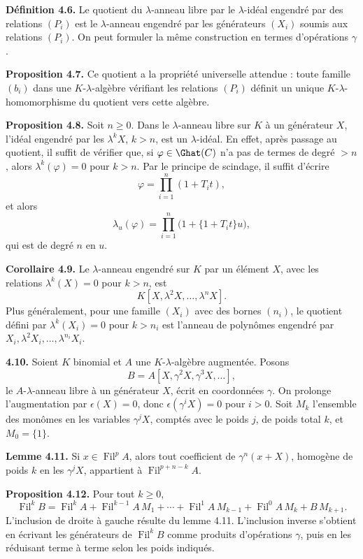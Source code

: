 \documentclass[11pt]{article}
\newcommand{\Fil}{\operatorname{Fil}}
\begin{document}
\textbf{Définition 4.6.} Le quotient du \(\lambda\)-anneau libre par le \(\lambda\)-idéal engendré par des relations \((P_i)\) est le \(\lambda\)-anneau engendré par les générateurs \((X_i)\) soumis aux relations \((P_i)\). On peut formuler la même construction en termes d'opérations \(\gamma\).

\textbf{Proposition 4.7.} Ce quotient a la propriété universelle attendue : toute famille \((b_i)\) dans une \(K\)-\(\lambda\)-algèbre vérifiant les relations \((P_i)\) définit un unique \(K\)-\(\lambda\)-homomorphisme du quotient vers cette algèbre.

\textbf{Proposition 4.8.} Soit \(n\ge0\). Dans le \(\lambda\)-anneau libre sur \(K\) à un générateur \(X\), l'idéal engendré par les \(\lambda^kX\), \(k>n\), est un \(\lambda\)-idéal. En effet, après passage au quotient, il suffit de vérifier que, si \(\varphi\in\Ghat(C)\) n'a pas de termes de degré \(>n\), alors \(\lambda^k(\varphi)=0\) pour \(k>n\). Par le principe de scindage, il suffit d'écrire
\[
  \varphi=\prod_{i=1}^{n}(1+T_it),
\]
et alors
\[
  \lambda_u(\varphi)=\prod_{i=1}^{n}\bigl(1+\{1+T_it\}u\bigr),
\]
qui est de degré \(n\) en \(u\).

\textbf{Corollaire 4.9.} Le \(\lambda\)-anneau engendré sur \(K\) par un élément \(X\), avec les relations \(\lambda^k(X)=0\) pour \(k>n\), est
\[
  K[X,\lambda^2X,\ldots,\lambda^nX].
\]
Plus généralement, pour une famille \((X_i)\) avec des bornes \((n_i)\), le quotient défini par \(\lambda^k(X_i)=0\) pour \(k>n_i\) est l'anneau de polynômes engendré par \(X_i,\lambda^2X_i,\ldots,\lambda^{n_i}X_i\).

\textbf{4.10.} Soient \(K\) binomial et \(A\) une \(K\)-\(\lambda\)-algèbre augmentée. Posons
\[
  B=A[X,\gamma^2X,\gamma^3X,\ldots],
\]
le \(A\)-\(\lambda\)-anneau libre à un générateur \(X\), écrit en coordonnées \(\gamma\). On prolonge l'augmentation par \(\epsilon(X)=0\), donc \(\epsilon(\gamma^iX)=0\) pour \(i>0\). Soit \(M_k\) l'ensemble des monômes en les variables \(\gamma^jX\), comptés avec le poids \(j\), de poids total \(k\), et \(M_0=\{1\}\).

\textbf{Lemme 4.11.} Si \(x\in\Fil^pA\), alors tout coefficient de \(\gamma^n(x+X)\), homogène de poids \(k\) en les \(\gamma^jX\), appartient à \(\Fil^{p+n-k}A\).

\textbf{Proposition 4.12.} Pour tout \(k\ge0\),
\begin{equation}\tag{4.12.1}
  \Fil^kB=
  \Fil^kA+\Fil^{k-1}A\,M_1+\cdots+\Fil^1A\,M_{k-1}
  +\Fil^0A\,M_k+B\,M_{k+1}.
\end{equation}
L'inclusion de droite à gauche résulte du lemme 4.11. L'inclusion inverse s'obtient en écrivant les générateurs de \(\Fil^kB\) comme produits d'opérations \(\gamma\), puis en les réduisant terme à terme selon les poids indiqués.
\end{document}
